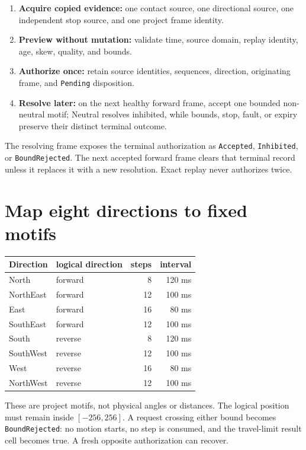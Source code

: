 \documentclass[10pt]{article}
\begin{document}
\begin{enumerate}
 \item \textbf{Acquire copied evidence:} one contact source, one directional
       source, one independent stop source, and one project frame identity.
 \item \textbf{Preview without mutation:} validate time, source domain,
       replay identity, age, skew, quality, and bounds.
 \item \textbf{Authorize once:} retain source identities, sequences,
       direction, originating frame, and \texttt{Pending} disposition.
 \item \textbf{Resolve later:} on the next healthy forward frame, accept one
       bounded non-neutral motif; Neutral resolves inhibited, while bounds,
       stop, fault, or expiry preserve their distinct terminal outcome.
\end{enumerate}

The resolving frame exposes the terminal authorization as
\texttt{Accepted}, \texttt{Inhibited}, or \texttt{BoundRejected}. The next
accepted forward frame clears that terminal record unless it replaces it with
a new resolution. Exact replay never authorizes twice.

\section{Map eight directions to fixed motifs}
\begin{tabularx}{\linewidth}{@{}l X r r@{}}
\toprule
Direction & logical direction & steps & interval\\
\midrule
North     & forward & 8  & 120 ms\\
NorthEast & forward & 12 & 100 ms\\
East      & forward & 16 & 80 ms\\
SouthEast & forward & 12 & 100 ms\\
South     & reverse & 8  & 120 ms\\
SouthWest & reverse & 12 & 100 ms\\
West      & reverse & 16 & 80 ms\\
NorthWest & reverse & 12 & 100 ms\\
\bottomrule
\end{tabularx}

These are project motifs, not physical angles or distances. The logical
position must remain inside \([-256,256]\). A request crossing either bound
becomes \texttt{BoundRejected}: no motion starts, no step is consumed, and
the travel-limit result cell becomes true. A fresh opposite authorization can
recover.
\end{document}
